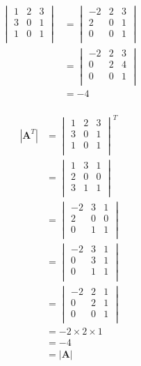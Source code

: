 \documentclass[10pt,oneside,a4paper]{article}
\begin{document}
\begin{enumerate}
\[
\begin{split}
\begin{vmatrix}
1 & 2 & 3 \\ 
3 & 0 & 1 \\ 
1 & 0 & 1 \\ 
\end{vmatrix}
&= 
\begin{vmatrix}
-2 & 2 & 3 \\ 
2 & 0 & 1 \\ 
0 & 0 & 1 \\ 
\end{vmatrix} \\
&= 
\begin{vmatrix}
-2 & 2 & 3 \\ 
0 & 2 & 4 \\ 
0 & 0 & 1 \\ 
\end{vmatrix} \\
&= -4 \\
\end{split}
\]

\[
\begin{split}
|\mathbf{A}^T|
&=
\begin{vmatrix}
1 & 2 & 3 \\ 
3 & 0 & 1 \\ 
1 & 0 & 1 \\ 
\end{vmatrix}^T \\
&= 
\begin{vmatrix}
1 & 3 & 1 \\ 
2 & 0 & 0 \\ 
3 & 1 & 1 \\ 
\end{vmatrix} \\
&= 
\begin{vmatrix}
-2 & 3 & 1 \\ 
2 & 0 & 0 \\ 
0 & 1 & 1 \\ 
\end{vmatrix} \\
&= 
\begin{vmatrix}
-2 & 3 & 1 \\ 
0 & 3 & 1 \\ 
0 & 1 & 1 \\ 
\end{vmatrix} \\
&= 
\begin{vmatrix}
-2 & 2 & 1 \\ 
0 & 2 & 1 \\ 
0 & 0 & 1 \\ 
\end{vmatrix} \\
&= -2 \times 2 \times 1 \\
&= -4 \\
&= |\mathbf{A}|
\end{split}
\]


\end{enumerate}
\end{document}
